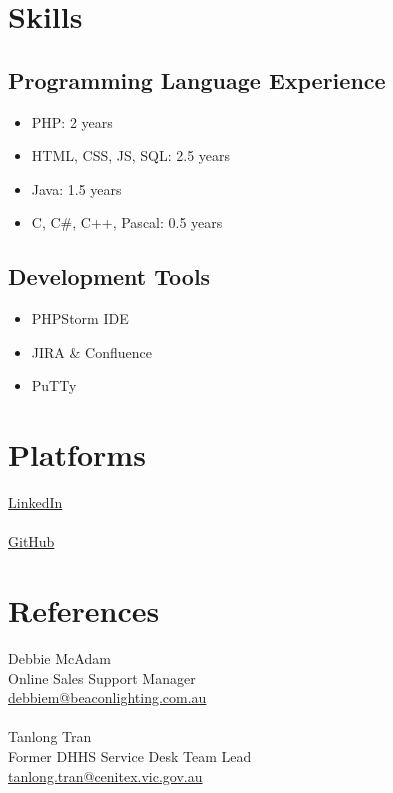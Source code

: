 \documentclass[a4paper, 12pt]{article}
\begin{document}
	\section*{Skills}
	\subsection*{Programming Language Experience}
	\begin{itemize}
		\item PHP: 2 years
		\item HTML, CSS, JS, SQL: 2.5 years
		\item Java: 1.5 years
		\item C, C\#, C++, Pascal: 0.5 years
	\end{itemize}
	\subsection*{Development Tools}
	\begin{itemize}
		\item PHPStorm IDE
		\item JIRA \& Confluence
		\item PuTTy
	\end{itemize}
	\section*{Platforms}
	\href{https://www.linkedin.com/in/david-buttler/}{LinkedIn}\\\\
	\href{https://github.com/dwbuttler}{GitHub}
	\section*{References}
	Debbie McAdam\\
	Online Sales Support Manager\\
	\href{mailto:debbiem@beaconlighting.com.au}{debbiem@beaconlighting.com.au}\\\\
	Tanlong Tran\\
	Former DHHS Service Desk Team Lead\\
	\href{mailto:tanlong.tran@cenitex.vic.gov.au}{tanlong.tran@cenitex.vic.gov.au}
\end{document}
